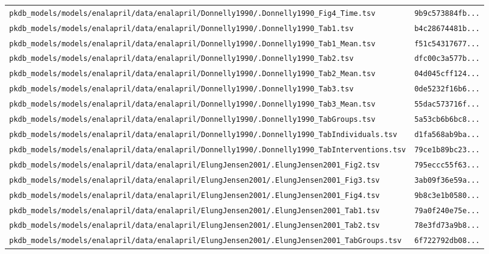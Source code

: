 \begin{longtable}{ll}
\texttt{pkdb\_models/models/enalapril/data/enalapril/Donnelly1990/.Donnelly1990\_Fig4\_Time.tsv} & \texttt{9b9c573884fb...} \\
\texttt{pkdb\_models/models/enalapril/data/enalapril/Donnelly1990/.Donnelly1990\_Tab1.tsv} & \texttt{b4c28674481b...} \\
\texttt{pkdb\_models/models/enalapril/data/enalapril/Donnelly1990/.Donnelly1990\_Tab1\_Mean.tsv} & \texttt{f51c54317677...} \\
\texttt{pkdb\_models/models/enalapril/data/enalapril/Donnelly1990/.Donnelly1990\_Tab2.tsv} & \texttt{dfc00c3a577b...} \\
\texttt{pkdb\_models/models/enalapril/data/enalapril/Donnelly1990/.Donnelly1990\_Tab2\_Mean.tsv} & \texttt{04d045cff124...} \\
\texttt{pkdb\_models/models/enalapril/data/enalapril/Donnelly1990/.Donnelly1990\_Tab3.tsv} & \texttt{0de5232f16b6...} \\
\texttt{pkdb\_models/models/enalapril/data/enalapril/Donnelly1990/.Donnelly1990\_Tab3\_Mean.tsv} & \texttt{55dac573716f...} \\
\texttt{pkdb\_models/models/enalapril/data/enalapril/Donnelly1990/.Donnelly1990\_TabGroups.tsv} & \texttt{5a53cb6b6bc8...} \\
\texttt{pkdb\_models/models/enalapril/data/enalapril/Donnelly1990/.Donnelly1990\_TabIndividuals.tsv} & \texttt{d1fa568ab9ba...} \\
\texttt{pkdb\_models/models/enalapril/data/enalapril/Donnelly1990/.Donnelly1990\_TabInterventions.tsv} & \texttt{79ce1b89bc23...} \\
\texttt{pkdb\_models/models/enalapril/data/enalapril/ElungJensen2001/.ElungJensen2001\_Fig2.tsv} & \texttt{795eccc55f63...} \\
\texttt{pkdb\_models/models/enalapril/data/enalapril/ElungJensen2001/.ElungJensen2001\_Fig3.tsv} & \texttt{3ab09f36e59a...} \\
\texttt{pkdb\_models/models/enalapril/data/enalapril/ElungJensen2001/.ElungJensen2001\_Fig4.tsv} & \texttt{9b8c3e1b0580...} \\
\texttt{pkdb\_models/models/enalapril/data/enalapril/ElungJensen2001/.ElungJensen2001\_Tab1.tsv} & \texttt{79a0f240e75e...} \\
\texttt{pkdb\_models/models/enalapril/data/enalapril/ElungJensen2001/.ElungJensen2001\_Tab2.tsv} & \texttt{78e3fd73a9b8...} \\
\texttt{pkdb\_models/models/enalapril/data/enalapril/ElungJensen2001/.ElungJensen2001\_TabGroups.tsv} & \texttt{6f722792db08...} \\

\end{longtable}
